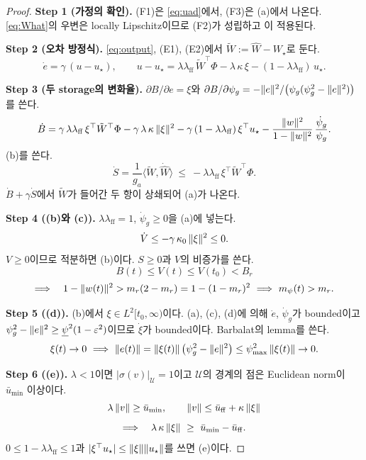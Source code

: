 \documentclass[11pt]{article}\usepackage[margin=1in]{geometry}\usepackage{amsmath,amssymb,amsthm,mathtools}\usepackage{graphicx}\graphicspath{{figures/}{../figures/}{figs/}{./}}\usepackage{enumitem}\usepackage{hyperref}\usepackage{cleveref}\usepackage{tikz}\usetikzlibrary{arrows.meta,positioning,calc,shapes.geometric}\usepackage{float}\usepackage[most]{tcolorbox}\usepackage{kotex}\usepackage{booktabs}\emergencystretch=1.6em\tolerance=2000 \crefname{assumption}{Assumption}{Assumptions}\Crefname{assumption}{Assumption}{Assumptions}\crefname{definition}{Definition}{Definitions}\Crefname{definition}{Definition}{Definitions}\crefname{proposition}{Proposition}{Propositions}\Crefname{proposition}{Proposition}{Propositions}\crefname{fact}{Fact}{Facts}\Crefname{fact}{Fact}{Facts} \newtheorem{assumption}{Assumption}\newtheorem{definition}{Definition}\newtheorem{lemma}{Lemma}\newtheorem{proposition}{Proposition}\newtheorem{theorem}{Theorem}\newtheorem{corollary}{Corollary}\newtheorem{fact}{Fact}\theoremstyle{remark}\newtheorem{remark}{Remark} \newcommand{\R}{\mathbb{R}}\newcommand{\U}{\mathcal U}
\begin{document}
\begin{proof}
\textbf{Step 1 (가정의 확인).} (F1)은 \eqref{eq:uad}에서, (F3)은 (a)에서 나온다. \eqref{eq:What}의 우변은 locally Lipschitz이므로 (F2)가 성립하고 이 적용된다.

\textbf{Step 2 (오차 방정식).} \eqref{eq:output}, (E1), (E2)에서 $\tilde W:=\hat W-W_\star$로 둔다.
\[
\dot e=\gamma\,(u-u_\star),\qquad u-u_\star=\lambda\lambda_{\mathrm{ff}}\,\tilde W^\top\Phi-\lambda\,\kappa\,\xi-(1-\lambda\lambda_{\mathrm{ff}})\,u_\star .
\]

\textbf{Step 3 (두 storage의 변화율).} $\partial B/\partial e=\xi$와 $\partial B/\partial\psi_g=-\lVert e\rVert^2/\big(\psi_g(\psi_g^2-\lVert e\rVert^2)\big)$를 쓴다.
\[
\dot B=\gamma\,\lambda\lambda_{\mathrm{ff}}\,\xi^\top\tilde W^\top\Phi-\gamma\,\lambda\,\kappa\,\lVert \xi\rVert^2-\gamma\,(1-\lambda\lambda_{\mathrm{ff}})\,\xi^\top u_\star-\frac{\lVert w\rVert^2}{1-\lVert w\rVert^2}\,\frac{\dot\psi_g}{\psi_g}.
\]
(b)를 쓴다.
\[
\dot S=\frac{1}{g_a}\langle\tilde W,\dot{\hat W}\rangle\ \le\ -\lambda\lambda_{\mathrm{ff}}\,\xi^\top\tilde W^\top\Phi .
\]
$\dot B+\gamma\dot S$에서 $\tilde W$가 들어간 두 항이 상쇄되어 (a)가 나온다.

\textbf{Step 4 ((b)와 (c)).} $\lambda\lambda_{\mathrm{ff}}=1$, $\dot\psi_g\ge0$을 (a)에 넣는다.
\[
\dot V\le-\gamma\,\kappa_0\,\lVert \xi\rVert^2\le0 .
\]
$V\ge0$이므로 적분하면 (b)이다. $S\ge0$과 $V$의 비증가를 쓴다.
\[
B(t)\le V(t)\le V(t_0)<B_r
\]
\[
\Longrightarrow\quad 1-\norm{w(t)}^2>m_r(2-m_r)=1-(1-m_r)^2\ \Longrightarrow\ m_\psi(t)>m_r .
\]

\textbf{Step 5 ((d)).} (b)에서 $\xi\in L^2[t_0,\infty)$이다. (a), (c), (d)에 의해 $\dot e$, $\dot\psi_g$가 bounded이고 $\psi_g^2-\lVert e\rVert^2\ge\underline\psi^2(1-\varepsilon^2)$이므로 $\dot\xi$가 bounded이다. Barbalat의 lemma를 쓴다.
\[
\xi(t)\to0\ \Longrightarrow\ \norm{e(t)}=\norm{\xi(t)}\,\big(\psi_g^2-\norm{e}^2\big)\le\psi_{\max}^2\,\norm{\xi(t)}\to0 .
\]

\textbf{Step 6 ((e)).} $\lambda<1$이면 $|\sigma(v)|_{\U}=1$이고 $\U$의 경계의 점은 Euclidean norm이 $\bar u_{\min}$ 이상이다.
\[
\lambda\,\lVert v\rVert\ge\bar u_{\min},\qquad \lVert v\rVert\le\bar u_{\mathrm{ff}}+\kappa\,\lVert \xi\rVert
\]
\[
\Longrightarrow\quad \lambda\,\kappa\,\norm{\xi}\ \ge\ \bar u_{\min}-\bar u_{\mathrm{ff}} .
\]
$0\le1-\lambda\lambda_{\mathrm{ff}}\le1$과 $|\xi^\top u_\star|\le\lVert \xi\rVert\lVert u_\star\rVert$를 쓰면 (e)이다.
\end{proof}
\end{document}
